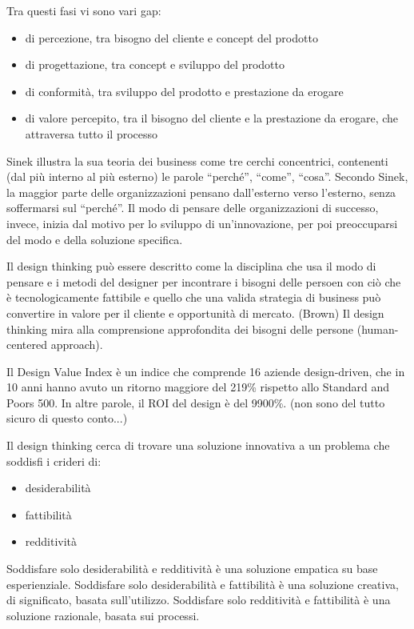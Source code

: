 \documentclass[answers, a4paper, 11pt]{exam}
\begin{document}
 Tra questi fasi vi sono vari gap:
 \begin{itemize}
     \item di percezione, tra bisogno del cliente e concept del prodotto
     \item di progettazione, tra concept e sviluppo del prodotto
     \item di conformità, tra sviluppo del prodotto e prestazione da erogare
     \item di valore percepito, tra il bisogno del cliente e la prestazione da erogare, che attraversa tutto il processo
 \end{itemize}
 
Sinek illustra la sua teoria dei business come tre cerchi concentrici, contenenti (dal più interno al più esterno) le parole ``perché'', ``come'', ``cosa''.
Secondo Sinek, la maggior parte delle organizzazioni pensano dall'esterno verso l'esterno, senza soffermarsi sul ``perché''.
Il modo di pensare delle organizzazioni di successo, invece, inizia dal motivo per lo sviluppo di un'innovazione, per poi preoccuparsi del modo e della soluzione specifica.

Il design thinking può essere descritto come la disciplina che usa il modo di pensare e i metodi del designer per incontrare i bisogni delle persoen con ciò che è tecnologicamente fattibile e quello che una valida strategia di business può convertire in valore per il cliente e opportunità di mercato. (Brown)
Il design thinking mira alla comprensione approfondita dei bisogni delle persone (human-centered approach).

Il Design Value Index è un indice che comprende 16 aziende design-driven, che in 10 anni hanno avuto un ritorno maggiore del 219\% rispetto allo Standard and Poors 500.
In altre parole, il ROI del design è del 9900\%. (non sono del tutto sicuro di questo conto...)

Il design thinking cerca di trovare una soluzione innovativa a un problema che soddisfi i crideri di:
\begin{itemize}
    \item desiderabilità
    \item fattibilità
    \item redditività
\end{itemize}

Soddisfare solo desiderabilità e redditività è una soluzione empatica su base esperienziale.
Soddisfare solo desiderabilità e fattibilità è una soluzione creativa, di significato, basata sull'utilizzo.
Soddisfare solo redditività e fattibilità è una soluzione razionale, basata sui processi.
\end{document}
